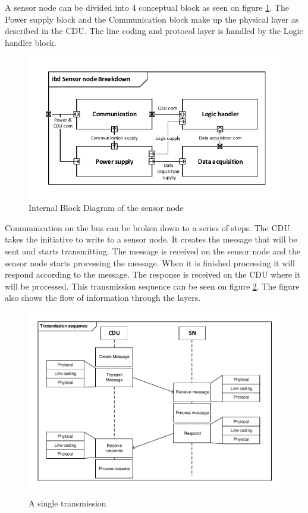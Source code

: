 A sensor node can be divided into 4 conceptual block as seen on figure \ref{fig:SN_IBD}. The Power supply block and the Communication block make up the physical layer as described in the CDU. The line coding and protocol layer is handled by the Logic handler block.
\begin{figure}[hbpt]
\centering
\includegraphics[width=.8\textwidth]{billeder/11ProjectDescription/Sensor_IBD}
\caption{Internal Block Diagram of the sensor node}
\label{fig:SN_IBD}
\end{figure}

Communication on the bus can be broken down to a series of steps. The CDU takes the initiative to write to a sensor node. It creates the message that will be sent and starts transmitting. The message is received on the sensor node and the sensor node starts processing the message. When it is finished processing it will respond according to the message. The response is received on the CDU where it will be processed. This transmission sequence can be seen on figure \ref{fig:sintrans}. The figure also shows the flow of information through the layers. 
\begin{figure}[hbpt]
\centering
\includegraphics[width=.8\textwidth]{billeder/11ProjectDescription/singletransmission}
\caption{A single transmission}
\label{fig:sintrans}
\end{figure}

